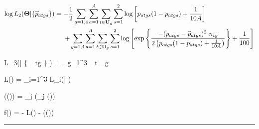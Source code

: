 
\vspace{-5ex}
\begin{fleqn}
\begin{eqnarray}
\nonumber \log L_2(\bfTh | \{ \widehat{p}_{atgs} \} ) = - \frac{1}{2} \sum_{g=1,4} \sum_{a=1}^A \sum_{t \in {\bf U}_g} \sum_{s=1}^2 \log \left[ p_{atgs} ( 1 - p_{atgs} ) + \frac{1}{10 A} \right]~~~~~~~~~~~~~~~~~~~~~~ \\
 + \sum_{g=1,4} \sum_{a=1}^A \sum_{t \in {\bf U}_g} \sum_{s=1}^2 \log \left[ \exp \left\{ \frac{- ( p_{atgs} - \widehat{p}_{atgs} )^2~n_{tg}}{2 \left( p_{atgs} ( 1 - p_{atgs} ) + \frac{1}{10 A} \right) } \right\} + \frac{1}{100} \right]
\label{ll2} %
\end{eqnarray}
\end{fleqn}
\vspace{-5ex}
 \vsd \vsd

\vsd
\vsd
\vsd

\beq 
\log L_3(\bfTh | \{ _{tg} \} ) = \sum_{g=1}^3 \sum_{t _g} %
  \label{ll3} \eeq \vsd \vsd \vsd \vsd \vsd

\beq \log L(\bfTh) = \sum_{i=1}^3 \log L_i(\bfTh | \cdot)  \label{llk} \eeq \vsd

 \eec

\vsd

\beq \log(\pi(\bfTh)) = \sum_{j} \log(\pi_j (\bfTh)) 
\label{jointprior}\eeq

\vsd \vsd \vsd \vsd

\beq f(\bfTh) = - \log L(\bfTh) - \log(\pi(\bfTh)) 
\label{objfn} \eeq


\vsd
\vsd
\vsd
\vsd

\noindent \hrule %

\clearpage

